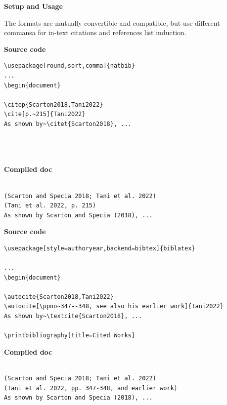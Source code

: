 \documentclass[a4paper,11pt]{article}
\begin{document}
{\Large{\textbf{Setup and Usage}}}

The formats are mutually convertible and compatible, but use different commansa for in-text citations and references list induction.\\


\begin{tcolorbox}[colback=blue!5!white, colframe=blue!85!gray, title=\textbf{Bibtex},center title, toptitle=2mm, bottomtitle=2mm]
	
\begin{multicols}{2}
	
\textbf{Source code}
\begin{lstlisting}
\usepackage[round,sort,comma]{natbib}
...
\begin{document}

\citep{Scarton2018,Tani2022}
\cite[p.~215]{Tani2022}
As shown by~\citet{Scarton2018}, ...




\end{lstlisting}

\break 

\textbf{Compiled doc}
\begin{lstlisting}

(Scarton and Specia 2018; Tani et al. 2022)
(Tani et al. 2022, p. 215)
As shown by Scarton and Specia (2018), ...
\end{lstlisting}
	
\end{multicols}

\end{tcolorbox}

\begin{tcolorbox}[colback=yellow!5!white, coltitle=black, colframe=yellow!65!gray, title=\textbf{BibLaTex}, toptitle=2mm, bottomtitle=2mm, center title]
\begin{multicols}{2}
	
\textbf{Source code}
\begin{lstlisting}
\usepackage[style=authoryear,backend=bibtex]{biblatex}

...
\begin{document}

\autocite{Scarton2018,Tani2022}
\autocite[\ppno~347--348, see also his earlier work]{Tani2022}
As shown by~\textcite{Scarton2018}, ...

\printbibliography[title=Cited Works]

\end{lstlisting}

\break

\textbf{Compiled doc}
\begin{lstlisting}

(Scarton and Specia 2018; Tani et al. 2022)
(Tani et al. 2022, pp. 347-348, and earlier work)
As shown by Scarton and Specia (2018), ...
\end{lstlisting}

\end{multicols}
	
\end{tcolorbox}
\end{document}
